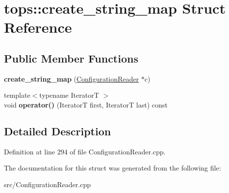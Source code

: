\hypertarget{structtops_1_1create__string__map}{}\section{tops\+:\+:create\+\_\+string\+\_\+map Struct Reference}
\label{structtops_1_1create__string__map}
\subsection*{Public Member Functions}
\begin{DoxyCompactItemize}
\item 
\mbox{\label{structtops_1_1create__string__map_a9e47b807d873d641e9808d1956a91ad7}} 
{\bfseries create\+\_\+string\+\_\+map} (\hyperlink{classtops_1_1ConfigurationReader}{Configuration\+Reader} $\ast$c)
\item 
\mbox{\label{structtops_1_1create__string__map_a5dda276db633c2a7a9c93499f1b49094}} 
{\footnotesize template$<$typename IteratorT $>$ }\\void {\bfseries operator()} (IteratorT first, IteratorT last) const
\end{DoxyCompactItemize}


\subsection{Detailed Description}


Definition at line 294 of file Configuration\+Reader.\+cpp.



The documentation for this struct was generated from the following file\+:\begin{DoxyCompactItemize}
\item 
src/Configuration\+Reader.\+cpp\end{DoxyCompactItemize}
